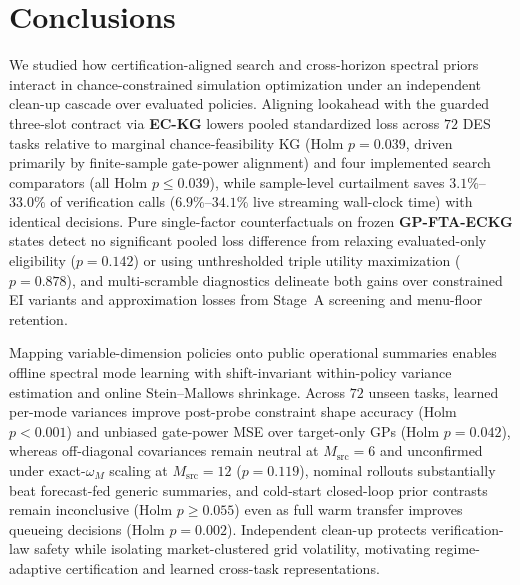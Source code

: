 \section{Conclusions}\label{sec:conclusion}

We studied how certification-aligned search and cross-horizon spectral priors interact in chance-constrained simulation optimization under an independent clean-up cascade over evaluated policies. Aligning lookahead with the guarded three-slot contract via \textbf{EC-KG} lowers pooled standardized loss across $72$ DES tasks relative to marginal chance-feasibility KG (Holm $p=0.039$, driven primarily by finite-sample gate-power alignment) and four implemented search comparators (all Holm $p\le 0.039$), while sample-level curtailment saves $3.1\%$--$33.0\%$ of verification calls ($6.9\%$--$34.1\%$ live streaming wall-clock time) with identical decisions. Pure single-factor counterfactuals on frozen \textbf{GP-FTA-ECKG} states detect no significant pooled loss difference from relaxing evaluated-only eligibility ($p=0.142$) or using unthresholded triple utility maximization ($p=0.878$), and multi-scramble diagnostics delineate both gains over constrained EI variants and approximation losses from Stage~A screening and menu-floor retention.

Mapping variable-dimension policies onto public operational summaries enables offline spectral mode learning with shift-invariant within-policy variance estimation and online Stein--Mallows shrinkage. Across $72$ unseen tasks, learned per-mode variances improve post-probe constraint shape accuracy (Holm $p<0.001$) and unbiased gate-power MSE over target-only GPs (Holm $p=0.042$), whereas off-diagonal covariances remain neutral at $M_{\mathrm{src}}=6$ and unconfirmed under exact-$\omega_M$ scaling at $M_{\mathrm{src}}=12$ ($p=0.119$), nominal rollouts substantially beat forecast-fed generic summaries, and cold-start closed-loop prior contrasts remain inconclusive (Holm $p\ge 0.055$) even as full warm transfer improves queueing decisions (Holm $p=0.002$). Independent clean-up protects verification-law safety while isolating market-clustered grid volatility, motivating regime-adaptive certification and learned cross-task representations.

